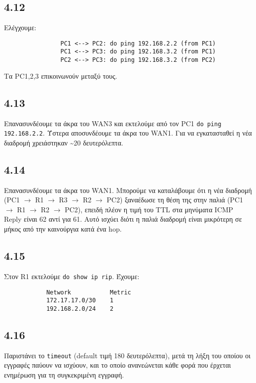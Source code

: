 \documentclass[a4paper, 12pt]{article}
\begin{document}
	\subsection*{4.12}
		Ελέγχουμε:
			
			\begin{verbatim}
				PC1 <--> PC2: do ping 192.168.2.2 (from PC1)
				PC1 <--> PC3: do ping 192.168.3.2 (from PC1)
				PC2 <--> PC3: do ping 192.168.3.2 (from PC2)
			\end{verbatim}
			
			Τα PC1,2,3 επικοινωνούν μεταξύ τους.

	\subsection*{4.13}
		Επανασυνδέουμε τα άκρα του WAN3 και εκτελούμε από τον PC1 \verb|do ping 192.168.2.2|. Ύστερα αποσυνδέουμε τα άκρα του WAN1. Για να εγκατασταθεί η νέα διαδρομή χρειάστηκαν \textasciitilde20 δευτερόλεπτα.

	\subsection*{4.14}
		Επανασυνδέουμε τα άκρα του WAN1. Μπορούμε να καταλάβουμε ότι η νέα διαδρομή (PC1 $\rightarrow$ R1 $\rightarrow$ R3 $\rightarrow$ R2 $\rightarrow$ PC2) ξαναέδωσε τη θέση της στην παλιά (PC1 $\rightarrow$ R1 $\rightarrow$ R2 $\rightarrow$ PC2), επειδή πλέον η τιμή του TTL στα μηνύματα ICMP Reply είναι 62 αντί για 61. Αυτό ισχύει διότι η παλιά διαδρομή είναι μικρότερη σε μήκος από την καινούργια κατά ένα hop.

	\subsection*{4.15}
		Στον R1 εκτελούμε \verb|do show ip rip|. Έχουμε:
		
		\begin{verbatim}
			Network           Metric
			172.17.17.0/30    1
			192.168.2.0/24    2
		\end{verbatim}

	\subsection*{4.16}
		Παριστάνει το \verb|timeout| (default τιμή 180 δευτερόλεπτα), μετά τη λήξη του οποίου οι εγγραφές παύουν να ισχύουν, και το οποίο ανανεώνεται κάθε φορά που έρχεται ενημέρωση για τη συγκεκριμένη εγγραφή.
\end{document}
